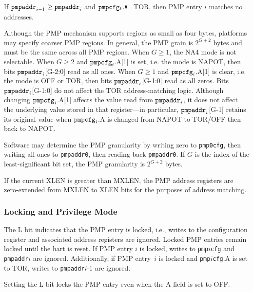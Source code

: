 \begin{commentary}
If ${\tt pmpaddr}_{i-1}\geq {\tt pmpaddr}_i$ and ${\tt pmpcfg_i.A}$=TOR,
then PMP entry $i$ matches no addresses.
\end{commentary}

Although the PMP mechanism supports regions as small as four bytes, platforms
may specify coarser PMP regions. In general, the PMP grain is $2^{G+2}$ bytes
and must be the same across all PMP regions.  When $G \geq 1$, the NA4 mode
is not selectable.  When $G \geq 2$ and ${\tt pmpcfg}_i$.A[1] is set, i.e.
the mode is NAPOT, then bits ${\tt pmpaddr}_i$[G-2:0] read as all ones.  When
$G \geq 1$ and ${\tt pmpcfg}_i$.A[1] is clear, i.e. the mode is OFF or TOR,
then bits ${\tt pmpaddr}_i$[G-1:0] read as all zeros.  Bits ${\tt
pmpaddr}_i$[G-1:0] do not affect the TOR address-matching logic.
Although changing ${\tt pmpcfg}_i$.A[1] affects the value read from
${\tt pmpaddr}_i$, it does not affect the underlying value stored in that
register---in particular, ${\tt pmpaddr}_i$[G-1] retains its original value
when ${\tt pmpcfg}_i$.A is changed from NAPOT to TOR/OFF then back to NAPOT.

\begin{commentary}
Software may determine the PMP granularity by writing zero to {\tt pmp0cfg},
then writing all ones to {\tt pmpaddr0}, then reading back {\tt pmpaddr0}.
If $G$ is the index of the least-significant bit set,
the PMP granularity is $2^{G+2}$ bytes.
\end{commentary}

If the current XLEN is greater than MXLEN, the PMP address registers are
zero-extended from MXLEN to XLEN bits for the purposes of address matching.

\subsubsection*{Locking and Privilege Mode}

The L bit indicates that the PMP entry is locked, i.e., writes to the
configuration register and associated address registers are ignored.  Locked
PMP entries remain locked until the hart is reset.  If PMP entry $i$ is
locked, writes to {\tt pmp}$i${\tt cfg} and {\tt pmpaddr}$i$ are ignored.
Additionally, if PMP entry~$i$ is locked and {\tt pmp}$i${\tt cfg}.A is set
to TOR, writes to {\tt pmpaddr}$i$-1 are ignored.

\begin{commentary}
Setting the L bit locks the PMP entry even when the A field is set to OFF.
\end{commentary}

